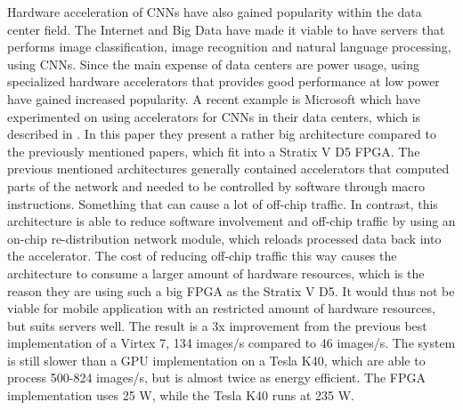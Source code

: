 Hardware acceleration of CNNs have also gained popularity within the data center field. The Internet and Big Data have made it viable to have servers that performs image classification, image recognition and natural language processing, using CNNs. Since the main expense of data centers are power usage, using specialized hardware accelerators that provides good performance at low power have gained increased popularity. A recent example is Microsoft which have experimented on using accelerators for CNNs in their data centers, which is described in \cite{Microsoft_paper}. In this paper they present a rather big architecture compared to the previously mentioned papers, which fit into a Stratix V D5 FPGA. The previous mentioned architectures generally contained accelerators that computed parts of the network and needed to be controlled by software through macro instructions. Something that can cause a lot of off-chip traffic. In contrast, this architecture is able to reduce software involvement and off-chip traffic by using an on-chip re-distribution network module, which reloads processed data back into the accelerator. The cost of reducing off-chip traffic this way causes the architecture to consume a larger amount of hardware resources, which is the reason they are using such a big FPGA as the Stratix V D5. It would thus not be viable for mobile application with an restricted amount of hardware resources, but suits servers well. The result is a 3x improvement from the previous best implementation of a Virtex 7, 134 images/s compared to 46 images/s. The system is still slower than a GPU implementation on a Tesla K40, which are able to process 500-824 images/s, but is almost twice as energy efficient. The FPGA implementation uses 25 W, while the Tesla K40 runs at 235 W. 

